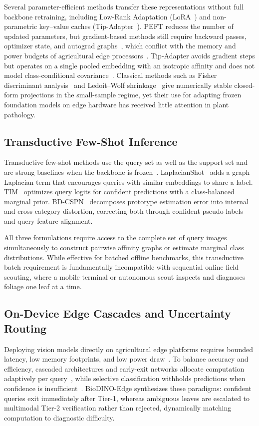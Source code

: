 Several parameter-efficient methods transfer these representations without full backbone retraining, including Low-Rank Adaptation (LoRA~\cite{hu2022lora}) and non-parametric key--value caches (Tip-Adapter~\cite{zhang2022tip}). PEFT reduces the number of updated parameters, but gradient-based methods still require backward passes, optimizer state, and autograd graphs~\cite{hu2022lora}, which conflict with the memory and power budgets of agricultural edge processors~\cite{radocaj2025evolution}. Tip-Adapter avoids gradient steps but operates on a single pooled embedding with an isotropic affinity and does not model class-conditional covariance~\cite{zhang2022tip}. Classical methods such as Fisher discriminant analysis~\cite{fisher1936use} and Ledoit--Wolf shrinkage~\cite{ledoit2004well} give numerically stable closed-form projections in the small-sample regime, yet their use for adapting frozen foundation models on edge hardware has received little attention in plant pathology.

\subsection{Transductive Few-Shot Inference}
Transductive few-shot methods use the query set as well as the support set and are strong baselines when the backbone is frozen~\cite{boudiaf2020transductive,ziko2020laplacian}. LaplacianShot~\cite{ziko2020laplacian} adds a graph Laplacian term that encourages queries with similar embeddings to share a label. TIM~\cite{boudiaf2020transductive} optimizes query logits for confident predictions with a class-balanced marginal prior. BD-CSPN~\cite{liu2020bdcspn} decomposes prototype estimation error into internal and cross-category distortion, correcting both through confident pseudo-labels and query feature alignment.

All three formulations require access to the complete set of query images simultaneously to construct pairwise affinity graphs or estimate marginal class distributions. While effective for batched offline benchmarks, this transductive batch requirement is fundamentally incompatible with sequential online field scouting, where a mobile terminal or autonomous scout inspects and diagnoses foliage one leaf at a time.

\subsection{On-Device Edge Cascades and Uncertainty Routing}
Deploying vision models directly on agricultural edge platforms requires bounded latency, low memory footprints, and low power draw~\cite{radocaj2025evolution,sharif2026real}. To balance accuracy and efficiency, cascaded architectures and early-exit networks allocate computation adaptively per query~\cite{viola2001rapid,teerapittayanon2016branchynet}, while selective classification withholds predictions when confidence is insufficient~\cite{geifman2017selective,traub2024overcoming}. BioDINO-Edge synthesizes these paradigms: confident queries exit immediately after Tier-1, whereas ambiguous leaves are escalated to multimodal Tier-2 verification rather than rejected, dynamically matching computation to diagnostic difficulty.

